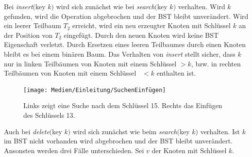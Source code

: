 \documentclass[a4paper,12pt]{article}
\begin{document}
Bei \textit{insert}$($key $k)$  wird sich zunächst wie bei  \textit{search}$($key $k)$ verhalten. Wird $k$ gefunden, wird die Operation abgebrochen und der BST bleibt unverändert. Wird ein leerer Teilbaum $T_2$ erreicht, wird ein neu erzeugter Knoten mit Schlüssel $k$ an der Position von $T_2$ eingefügt. Durch den neuen Knoten wird keine BST Eigenschaft verletzt. Durch Ersetzen eines leeren Teilbaumes durch einen Knoten bleibt es bei einem binären Baum. Das Verhalten von  \textit{insert} stellt sicher, dass $k$ nur in linken Teilbäumen von Knoten mit einem Schlüssel $> k$, bzw. in rechten Teilbäumen von Knoten mit einem Schlüssel~ $< k$ enthalten ist.    \\
\begin{figure}[H]
	\centering
	\texttt{[image: Medien/Einleitung/SuchenEinfügen]}
	\caption{Links zeigt eine Suche nach dem Schlüssel 15. Rechts das Einfügen des Schlüssels 13.}
	\label{fig:SuchenEinfügen}
\end{figure}
\noindent Auch bei \textit{delete}$($key $k)$ wird sich zunächst wie beim  \textit{search}$($key $k)$ verhalten. Ist $k$ im BST nicht vorhanden wird abgebrochen und der BST bleibt unverändert. Ansonsten werden drei Fälle unterschieden.
Sei $v$ der Knoten mit Schlüssel $k$.
\end{document}
